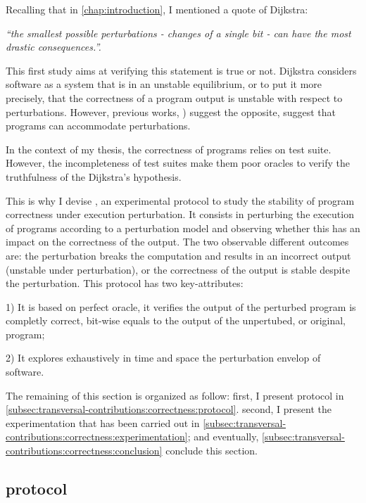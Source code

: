 Recalling that in \autoref{chap:introduction}, I mentioned a quote of Dijkstra:
\begin{center}
	\emph{``the smallest possible perturbations - \ie changes of a single bit - can have the most drastic consequences.''.}
\end{center}

This first study aims at verifying this statement is true or not.
Dijkstra considers software as a system that is in an unstable equilibrium, or to put it more precisely, that the correctness of a program output is unstable with respect to perturbations.
However, previous works, \eg\cite{Rinard:2005:EAE:1094855.1094866,Li2007Correctness}) suggest the opposite, \ie suggest that programs can accommodate perturbations.

In the context of my thesis, the correctness of programs relies on test suite.
However, the incompleteness of test suites make them poor oracles to verify the truthfulness of the Dijkstra's hypothesis.

This is why I devise \perturb, an experimental protocol to study the stability of program correctness under execution perturbation.
It consists in perturbing the execution of programs according to a perturbation model and observing whether this has an impact on the correctness of the output.
The two observable different outcomes are: 
the perturbation breaks the computation and results in an incorrect output (unstable under perturbation), 
or the correctness of the output is stable despite the perturbation.
This protocol has two key-attributes:

1) It is based on perfect oracle, \ie it verifies the output of the perturbed program is completly correct, \ie bit-wise equals to the output of the unpertubed, or original, program;

2) It explores exhaustively in time and space the perturbation envelop of software.

The remaining of this section is organized as follow: 
first, I present \perturb protocol in \autoref{subsec:transversal-contributions:correctness:protocol}.
second, I present the experimentation that has been carried out in \autoref{subsec:transversal-contributions:correctness:experimentation};
and eventually, \autoref{subsec:transversal-contributions:correctness:conclusion} conclude this section.

\subsection{\perturb protocol}
\label{subsec:transversal-contributions:correctness:protocol}

